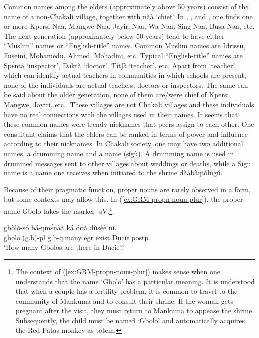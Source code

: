 \begin{exe}
\begin{exe}
\begin{exe}
\begin{exe}
\begin{exe}
\begin{exe}
\begin{exe}
Common names among the  elders (approximately above 50 years) consist of the name of a non-Chakali village,  together with {\sls nàà} `chief'. In , , and , one finds one or more Kpersi Naa, Mangwe Naa, Jayiri Naa, Wa Naa, Sing Naa,  Busa Naa, etc. The next generation (approximately below 50 years) tend to have either ``Muslim'' names or ``English-title'' names. Common Muslim names are Idrissu, Fuseini, Mohamedu, Ahmed, Mohadini, etc.  Typical ``English-title'' names are {\sls Spɛ́ntà} `inspector',  {\sls Dɔ́ktà} `doctor', {\sls Títʃà} `teacher', etc. Apart from `teacher',  which can identify actual teachers in communities in which schools are present, none of the individuals are actual teachers, doctors or inspectors. The same can be said about the older generation, none of them are/were chief of Kpersi, Mangwe, Jayiri, etc.. These villages are not Chakali villages and these individuals have no real connections with the villages used in their names. It seems that these common names were trendy  nicknames that peers  assign to each other. One consultant claims that the elders can be ranked in terms of power and influence according to their nicknames. In Chakali society, one may have two additional names, a drumming name and a  name ({\sls sígù}). A drumming name is used in drummed messages sent to other villages about weddings or deaths,  while a Sigu name is a name one receives when initiated to the shrine {\sls  dààbàŋtólúgú}. 


Because of their pragmatic function,  proper nouns  are rarely observed in a  form, but some contexts may allow this. In (\ref{ex:GRM-propn-noun-plur}), the proper name {\sls Gbolo} takes the  marker {\sls -sV}.\footnote{The context of (\ref{ex:GRM-propn-noun-plur}) makes sense when one understands that the name `Gbolo' has a particular meaning.  It is understood that when a couple has a  fertility problem,  it is common to travel to the community of Mankuma and to consult their shrine. If the woman gets pregnant after the visit, they must return to Mankuma to appease the shrine. Subsequently, the child must be named `Gbolo' and automatically acquires the Red Patas monkey as  totem.}


  \begin{exe}
   \ex\label{ex:GRM-propn-noun-plur}
\gll  gbòlò-só bá-ŋmɛ̀nàá ká dʊ̀à dùsèè ní.\\
gbolo.({\sc g.}b)-{\sc pl}  {\sc g.}b-{\sc q}.many {\sc  egr} exist Ducie {\sc
postp}\\
\glt  `How many Gbolos are there in Ducie?' 
 \z


\end{exe}
\end{exe}
\end{exe}
\end{exe}
\end{exe}
\end{exe}
\end{exe}
\end{exe}
